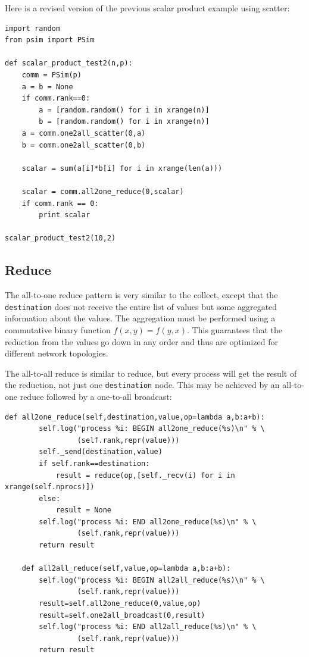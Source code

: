 \documentclass[justified,sixbynine]{tufte-book}
\def\ft{\small\tt}
\theoremstyle{plain}%
\theoremstyle{definition}
\theoremstyle{remark}
\begin{document}
\begin{fullwidth}
Here is a revised version of the previous scalar product example using scatter:

\begin{lstlisting}[caption={in file: {\ft psim\_scalar2.py}}]
import random
from psim import PSim

def scalar_product_test2(n,p):
    comm = PSim(p)
    a = b = None
    if comm.rank==0:
        a = [random.random() for i in xrange(n)]
        b = [random.random() for i in xrange(n)]
    a = comm.one2all_scatter(0,a)
    b = comm.one2all_scatter(0,b)

    scalar = sum(a[i]*b[i] for i in xrange(len(a)))

    scalar = comm.all2one_reduce(0,scalar)
    if comm.rank == 0:
        print scalar

scalar_product_test2(10,2)
\end{lstlisting}

\goodbreak\subsection{Reduce}

The all-to-one reduce pattern is very similar to the collect, except that the {\ft destination} does not receive the entire list of values but some aggregated information about the values. The aggregation must be performed using a commutative binary function $f(x,y)=f(y,x)$. This guarantees that the reduction from the values go down in any order and thus are optimized for different network topologies.

The all-to-all reduce is similar to reduce, but every process will get the result of the reduction, not just one {\ft destination} node. This may be achieved by an all-to-one reduce followed by a one-to-all broadcast:

\begin{lstlisting}[caption={in file: {\ft psim.py}}]
    def all2one_reduce(self,destination,value,op=lambda a,b:a+b):
        self.log("process %i: BEGIN all2one_reduce(%s)\n" % \
                 (self.rank,repr(value)))
        self._send(destination,value)
        if self.rank==destination:
            result = reduce(op,[self._recv(i) for i in xrange(self.nprocs)])
        else:
            result = None
        self.log("process %i: END all2one_reduce(%s)\n" % \
                 (self.rank,repr(value)))
        return result

    def all2all_reduce(self,value,op=lambda a,b:a+b):
        self.log("process %i: BEGIN all2all_reduce(%s)\n" % \
                 (self.rank,repr(value)))
        result=self.all2one_reduce(0,value,op)
        result=self.one2all_broadcast(0,result)
        self.log("process %i: END all2all_reduce(%s)\n" % \
                 (self.rank,repr(value)))
        return result
\end{lstlisting}


\end{fullwidth}
\end{document}
